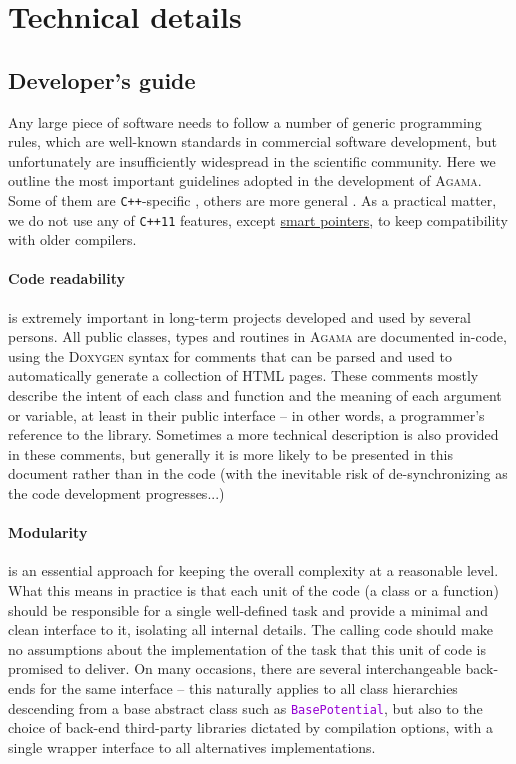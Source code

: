 \documentclass[12pt]{article}
\newcommand{\Agama}{\textsc{Agama}\xspace}
\newcommand{\Cpp}  {\texttt{C++}\xspace}
\newcommand{\CppII}{\texttt{C++11}\xspace}
\newcommand{\ttt}[1]{\textcolor{darkviolet}{\texttt{#1}}}
\begin{document}
\newpage
\appendix

\section{Technical details}

\subsection{Developer's guide}  \label{sec:DeveloperGuide}

Any large piece of software needs to follow a number of generic programming rules, which are well-known standards in commercial software development, but unfortunately are insufficiently widespread in the scientific community. Here we outline the most important guidelines adopted in the development of \Agama. Some of them are \Cpp-specific \cite{Meyers,SutterAlexandrescu}, others are more general \cite{Martin,McConnell}.
As a practical matter, we do not use any of \CppII features, except \hyperref[sec:SmartPointers]{smart pointers}, to keep compatibility with older compilers.

\paragraph{Code readability} is extremely important in long-term projects developed and used by several persons. All public classes, types and routines in \Agama are documented in-code, using the \textsc{Doxygen} syntax for comments that can be parsed and used to automatically generate a collection of HTML pages. These comments mostly describe the intent of each class and function and the meaning of each argument or variable, at least in their public interface -- in other words, a programmer's reference to the library. Sometimes a more technical description is also provided in these comments, but generally it is more likely to be presented in this document rather than in the code (with the inevitable risk of de-synchronizing as the code development progresses...)

\paragraph{Modularity} is an essential approach for keeping the overall complexity at a reasonable level. What this means in practice is that each unit of the code (a class or a function) should be responsible for a single well-defined task and provide a minimal and clean interface to it, isolating all internal details. The calling code should make no assumptions about the implementation of the task that this unit of code is promised to deliver. On many occasions, there are several interchangeable back-ends for the same interface -- this naturally applies to all class hierarchies descending from a base abstract class such as \ttt{BasePotential}, but also to the choice of back-end third-party libraries dictated by compilation options, with a single wrapper interface to all alternatives implementations.
\end{document}
